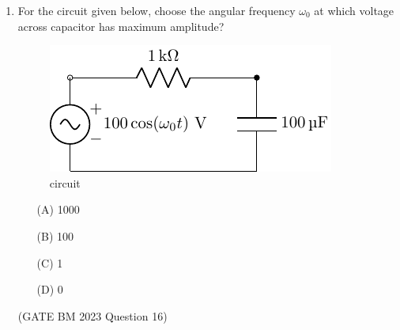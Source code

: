 \begin{enumerate}[label=\thechapter.\arabic*,ref=\thechapter.\theenumi]
\item
For the circuit given below, choose the angular frequency $ \omega_0$ at which voltage across capacitor has maximum amplitude?
\begin{figure}[h!]
    \includegraphics[width = 0.5\columnwidth]{2023/BM/16/figs/c_fig1.pdf}
    \caption{circuit }
    \centering
    \label{fig: bm_16_fig_1}
\end{figure}
\begin{enumerate}
    \item[(A)] 1000
    \item[(B)] 100
    \item[(C)] 1
    \item[(D)] 0   
\end{enumerate}
\hfill(GATE BM 2023 Question 16)\\


\end{enumerate}
